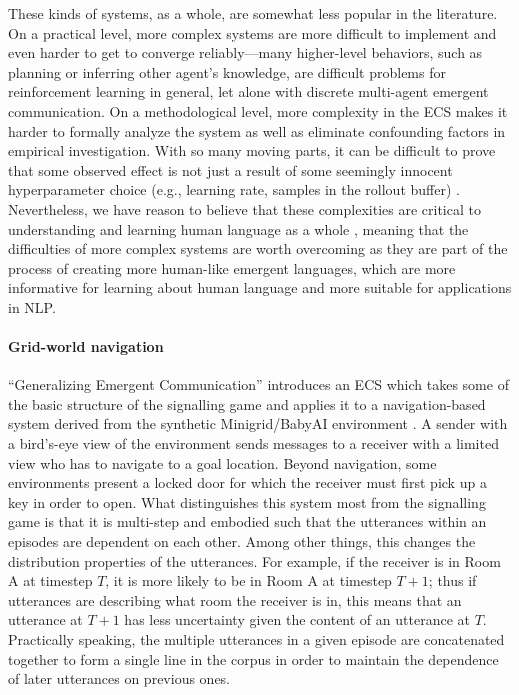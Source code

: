 These kinds of systems, as a whole, are somewhat less popular in the literature.
On a practical level, more complex systems are more difficult to implement and even harder to get to converge reliably---many higher-level behaviors, such as planning or inferring other agent's knowledge, are difficult problems for reinforcement learning in general, let alone with discrete multi-agent emergent communication.
On a methodological level, more complexity in the ECS makes it harder to formally analyze the system as well as eliminate confounding factors in empirical investigation.
With so many moving parts, it can be difficult to prove that some observed effect is not just a result of some seemingly innocent hyperparameter choice (e.g., learning rate, samples in the rollout buffer) \citep{boldt2023mathmodel}.
Nevertheless, we have reason to believe that these complexities are critical to understanding and learning human language as a whole \citep{bisk-etal-2020-experience}, meaning that the difficulties of more complex systems are worth overcoming as they are part of the process of creating more human-like emergent languages, which are more informative for learning about human language and more suitable for applications in NLP\@.


\paragraph{Grid-world navigation}
``Generalizing Emergent Communication'' \citep[BSD-3-clause license]{unger2020GeneralizingEC} introduces an ECS which takes some of the basic structure of the signalling game and applies it to a navigation-based system derived from the synthetic Minigrid/BabyAI environment \citep{chevalier2018babyai,MinigridMiniworld23}.
A sender with a bird's-eye view of the environment sends messages to a receiver with a limited view who has to navigate to a goal location.
Beyond navigation, some environments present a locked door for which the receiver must first pick up a key in order to open.
What distinguishes this system most from the signalling game is that it is multi-step and embodied such that the  utterances within an episodes are dependent on each other.
Among other things, this changes the distribution properties of the utterances.
For example, if the receiver is in Room A at timestep $T$, it is more likely to be in Room A at timestep $T+1$; thus if utterances are describing what room the receiver is in, this means that an utterance at $T+1$ has less uncertainty given the content of an utterance at $T$.
Practically speaking, the multiple utterances in a given episode are concatenated together to form a single line in the corpus in order to maintain the dependence of later utterances on previous ones.

